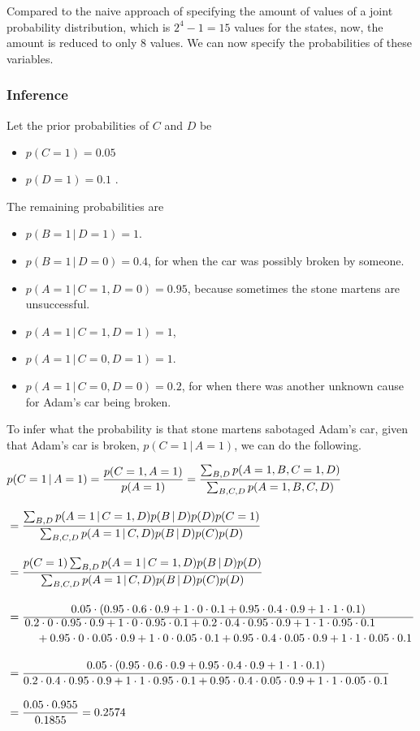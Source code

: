 \documentclass{article}
\begin{document}
\noindent Compared to the naive approach of specifying the amount of values of a joint probability distribution, which is $2^4 - 1 = 15$ values for the states, now, the amount is reduced to only 8 values. We can now specify the probabilities of these variables. 

\subsubsection{Inference}

\noindent Let the prior probabilities of $C$ and $D$ be 
\begin{itemize}
    \item $p(C=1) = 0.05$
    \item $p(D=1) = 0.1$ .  
\end{itemize}
The remaining probabilities are
\begin{itemize}
    \item $p(B=1 \,|\, D=1) = 1$.
    \item $p(B=1 \,|\, D=0) = 0.4$, for when the car was possibly broken by someone.
    \item $p(A=1 \,|\, C=1, D=0) = 0.95$, because sometimes the stone martens are unsuccessful.
    \item $p(A=1 \,|\, C=1, D=1) = 1$,  
    \item $p(A=1 \,|\, C=0, D=1) = 1$.
    \item $p(A=1 \,|\, C=0, D=0) = 0.2$, for when there was another unknown cause for Adam's car being broken.
\end{itemize}  

\noindent To infer what the probability is that stone martens sabotaged Adam's car, given that Adam's car is broken, $p(C=1 \,|\, A=1)$, we can do the following. 

\begin{align*}
    &p(C=1 \,|\, A=1) = \frac{p(C=1, A=1)}{p(A=1)} = \frac{\sum_{B, D} p(A=1, B, C=1, D)}{\sum_{B, C, D} p(A=1, B, C, D)} \\[1em]
    &= \frac{\sum_{B, D} p(A=1 \,|\, C=1, D)p(B \,|\, D)p(D)p(C=1)}{\sum_{B, C, D} p(A=1 \,|\, C, D) p(B \,|\, D) p(C) p(D)} \\[1em]
    &= \frac{p(C=1) \sum_{B, D} p(A=1 \,|\, C=1, D)p(B \,|\, D)p(D)}{\sum_{B, C, D} p(A=1 \,|\, C, D) p(B \,|\, D) p(C) p(D)} \\[1em]
    &= \dfrac{0.05 \cdot (0.95 \cdot 0.6 \cdot 0.9 + 1 \cdot 0 \cdot 0.1 + 0.95 \cdot 0.4 \cdot 0.9 + 1 \cdot 1 \cdot 0.1)}{\splitdfrac{0.2 \cdot 0 \cdot 0.95 \cdot 0.9 + 1 \cdot 0 \cdot 0.95 \cdot 0.1 + 0.2 \cdot 0.4 \cdot 0.95 \cdot 0.9 + 1 \cdot 1 \cdot 0.95 \cdot 0.1 }{ + 0.95 \cdot 0 \cdot 0.05 \cdot 0.9 + 1 \cdot 0 \cdot 0.05 \cdot 0.1 + 0.95 \cdot 0.4 \cdot 0.05 \cdot 0.9 + 1 \cdot 1 \cdot 0.05 \cdot 0.1}} \\[1em]
    &= \frac{0.05 \cdot (0.95 \cdot 0.6 \cdot 0.9 + 0.95 \cdot 0.4 \cdot 0.9 + 1 \cdot 1 \cdot 0.1)}{0.2 \cdot 0.4 \cdot 0.95 \cdot 0.9 + 1 \cdot 1 \cdot 0.95 \cdot 0.1 + 0.95 \cdot 0.4 \cdot 0.05 \cdot 0.9 + 1 \cdot 1 \cdot 0.05 \cdot 0.1} \\[1em]
    &= \frac{0.05 \cdot 0.955}{0.1855} = 0.2574
\end{align*}
\end{document}
